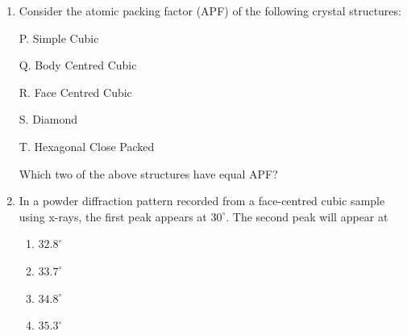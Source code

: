 \documentclass[journal,12pt,onecolumn]{IEEEtran}
\begin{document}
\begin{enumerate}[itemsep = 1em]
\hfill{}
\begin{enumerate}
\end{enumerate}

\item Consider the atomic packing factor (APF) of the following crystal structures:

P. Simple Cubic

Q. Body Centred Cubic

R. Face Centred Cubic

S. Diamond

T. Hexagonal Close Packed

Which two of the above structures have equal APF?

\hfill{}
\begin{enumerate}
\end{enumerate}

\item In a powder diffraction pattern recorded from a face-centred cubic sample using x-rays, the first peak appears at $30^\circ$. The second peak will appear at

\hfill{}
\begin{multicols}{4}
\begin{enumerate}

\item $32.8^\circ$
\item $33.7^\circ$
\item $34.8^\circ$
\item $35.3^\circ$

\end{enumerate}
\end{multicols}


\vspace{8em}


\end{enumerate}
\end{document}
